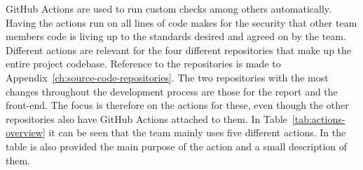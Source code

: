 GitHub Actions are used to run custom checks among others automatically.
Having the actions run on all lines of code makes for the security that other team members code is living up to the
standards desired and agreed on by the team.
Different actions are relevant for the four different repositories that make up the entire project codebase.
Reference to the repositories is made to Appendix~\ref{ch:source-code-repositories}.
The two repositories with the most changes throughout the development process are those for the report and the
front-end.
The focus is therefore on the actions for these, even though the other repositories also have GitHub Actions
attached to them.
In Table~\ref{tab:actions-overview} it can be seen that the team mainly uses five different actions.
In the table is also provided the main purpose of the action and a small description of them.

